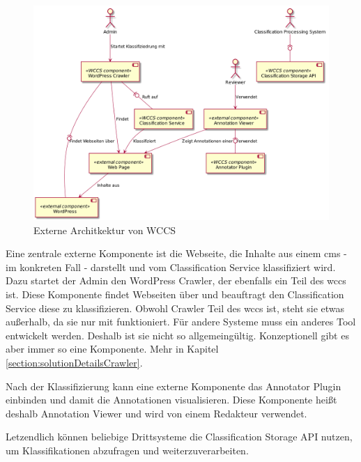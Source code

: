         \begin{figure}
            \centering
            \includegraphics[scale=\imageScalingFactor]{../resources/architecture/external_architecture.png}
            \caption{Externe Architkektur von WCCS}
            \label{image:wccsExternalArchitecture}
        \end{figure}

        Eine zentrale externe Komponente ist die Webseite,
        die Inhalte aus einem \gls{cms} - im konkreten Fall {\wordpress} -
        darstellt und vom Classification Service klassifiziert wird.
        Dazu startet der Admin den WordPress Crawler, der ebenfalls ein Teil des \gls{wccs} ist.
        Diese Komponente findet Webseiten über {\wordpress} und beauftragt den
        Classification Service diese zu klassifizieren.
        Obwohl Crawler Teil des \gls{wccs} ist, steht sie etwas außerhalb,
        da sie nur mit {\wordpress} funktioniert. Für andere Systeme muss ein anderes Tool
        entwickelt werden. Deshalb ist sie nicht so allgemeingültig.
        Konzeptionell gibt es aber immer so eine Komponente.
        Mehr in Kapitel \ref{section:solutionDetailsCrawler}.

        Nach der Klassifizierung kann eine externe Komponente das Annotator Plugin
        einbinden und damit die Annotationen visualisieren.
        Diese Komponente heißt deshalb Annotation Viewer und wird von einem Redakteur
        verwendet.

        Letzendlich können beliebige Drittsysteme die Classification Storage API
        nutzen, um Klassifikationen abzufragen und weiterzuverarbeiten.